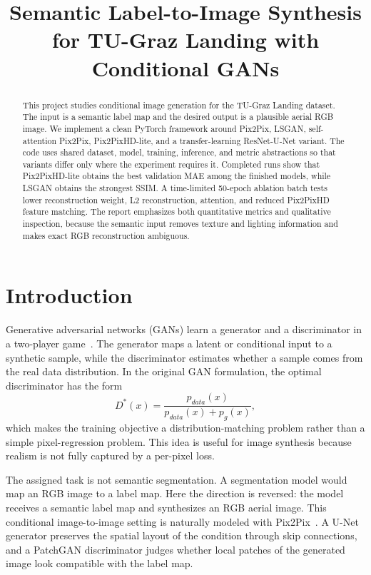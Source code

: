 \documentclass[conference]{IEEEtran}
\title{Semantic Label-to-Image Synthesis for TU-Graz Landing with Conditional GANs}
\author{
\IEEEauthorblockN{Erik Figueiral Alonso, Roi Cores Cabaleiro}
\IEEEauthorblockA{Computer Vision II\\
Submission package: \code{CV2\_ASSIGMENT\_GAN}}
}
\begin{document}
\maketitle

\begin{abstract}
This project studies conditional image generation for the TU-Graz Landing dataset. The input is a semantic label map and the desired output is a plausible aerial RGB image. We implement a clean PyTorch framework around Pix2Pix, LSGAN, self-attention Pix2Pix, Pix2PixHD-lite, and a transfer-learning ResNet-U-Net variant. The code uses shared dataset, model, training, inference, and metric abstractions so that variants differ only where the experiment requires it. Completed runs show that Pix2PixHD-lite obtains the best validation MAE among the finished models, while LSGAN obtains the strongest SSIM. A time-limited 50-epoch ablation batch tests lower reconstruction weight, L2 reconstruction, attention, and reduced Pix2PixHD feature matching. The report emphasizes both quantitative metrics and qualitative inspection, because the semantic input removes texture and lighting information and makes exact RGB reconstruction ambiguous.
\end{abstract}

\section{Introduction}
Generative adversarial networks (GANs) learn a generator and a discriminator in a two-player game~\cite{goodfellow2014gan}. The generator maps a latent or conditional input to a synthetic sample, while the discriminator estimates whether a sample comes from the real data distribution. In the original GAN formulation, the optimal discriminator has the form
\begin{equation}
D^*(x)=\frac{p_{data}(x)}{p_{data}(x)+p_g(x)},
\end{equation}
which makes the training objective a distribution-matching problem rather than a simple pixel-regression problem. This idea is useful for image synthesis because realism is not fully captured by a per-pixel loss.

The assigned task is not semantic segmentation. A segmentation model would map an RGB image to a label map. Here the direction is reversed: the model receives a semantic label map and synthesizes an RGB aerial image. This conditional image-to-image setting is naturally modeled with Pix2Pix~\cite{isola2017pix2pix}. A U-Net generator preserves the spatial layout of the condition through skip connections, and a PatchGAN discriminator judges whether local patches of the generated image look compatible with the label map.
\end{document}

